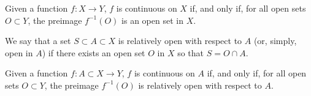 
\begin{thm}{}{}
	Given a function \(f\colon X \to Y\), \(f\) is continuous on \(X\) if, and only if, for all open sets \(O \subset Y\), the preimage \(f^{-1}(O)\) is an open set in \(X\).
\end{thm}

\begin{defn}{}{}
	We say that a set \(S \subset A \subset X\) is relatively open with respect to \(A\) (or, simply, open in \(A\)) if there exists an open set \(O\) in \(X\) so that \(S = O \cap A\).
\end{defn}

\begin{thm}{}{}
	Given a function \(f\colon A \subset X \to Y\),  \(f\) is continuous on \(A\) if, and only if, for all open sets \(O \subset Y\), the preimage  \(f^{-1}(O)\) is relatively open with respect to \(A\).
\end{thm}
